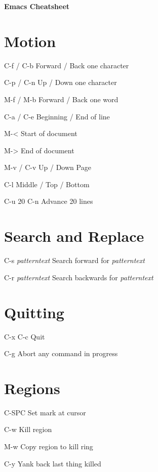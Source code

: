 \documentclass[11pt,a4paper]{article}
\begin{document}
\begin{center}
  {
    \huge \bfseries Emacs Cheatsheet
    \vspace{0.5 cm}
  }
\end{center}

\begin{multicols}{2}

\section{Motion}
\begin{eqlist}
\item[C-f / C-b] Forward / Back one character
\item[C-p / C-n] Up / Down one character
\item[M-f / M-b] Forward / Back one word
\item[C-a / C-e] Beginning / End of line
\item[M-\textless] Start of document
\item[M-\textgreater] End of document
\item[M-v / C-v] Up / Down Page
\item[C-l] Middle / Top / Bottom
\item[C-u 20 C-n] Advance 20 lines
\end{eqlist}

\section{Search and Replace}
\begin{eqlist}
\item[C-s \textit{patterntext}] Search forward for
  \textit{patterntext}
\item[C-r \textit{patterntext}] Search backwards for
  \textit{patterntext}
\end{eqlist}

\section{Quitting}
\begin{eqlist}
\item[C-x C-c] Quit
\item[C-g] Abort any command in progress
\end{eqlist}

\section{Regions}
\begin{eqlist}
\item[C-SPC] Set mark at cursor
\item[C-w] Kill region
\item[M-w] Copy region to kill ring
\item[C-y] Yank back last thing killed
\end{eqlist}


\end{multicols}
\end{document}
